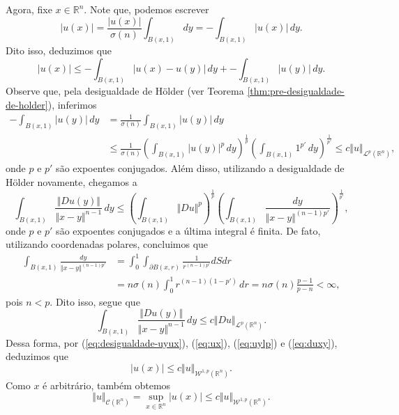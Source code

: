\documentclass[a4paper, 11pt]{book}
\theoremstyle{definition}
\newcommand{\bR}{\mathbb{R}}
\newcommand{\cC}{\mathcal{C}}
\newcommand{\cL}{\mathcal{L}}
\newcommand{\cW}{\mathcal{W}}
\newcommand{\sint}{-\!\!\!\!\!\!\int}
\begin{document}
\begin{prf}
    Agora, fixe $x \in \bR^n$. Note que, podemos escrever
    \[
        |u(x)| = \frac{|u(x)|}{\sigma(n)}\int_{B(x,1)} dy = \sint_{B(x,1)} |u(x)| \,dy.
    \]
    Dito isso, deduzimos que
    \begin{equation} \label{eq:ux}
        |u(x)| \leqslant \sint_{B(x,1)} |u(x) - u(y)| \,dy + \sint_{B(x,1)} |u(y)|\,dy.
    \end{equation}
    Observe que, pela desigualdade de Hölder (ver Teorema \ref{thm:pre-desigualdade-de-holder}), inferimos
    \begin{equation} \label{eq:uylp}
        \begin{aligned}
            \sint_{B(x,1)} |u(y)| \,dy &= \frac{1}{\sigma(n)} \int_{B(x,1)} |u(y)| \,dy\\ 
            &\leqslant \frac{1}{\sigma(n)} \left( \int_{B(x,1)} |u(y)|^p\,dy \right)^{\frac{1}{p}} \left( \int_{B(x,1)} 1^{p'} \,dy \right)^{\frac{1}{p'}} \leqslant c \Vert u \Vert_{\cL^p(\bR^n)},
        \end{aligned}
    \end{equation}
    onde $p$ e $p'$ são expoentes conjugados.
    Além disso, utilizando a desigualdade de Hölder novamente, chegamos a
    \[
        \int_{B(x,1)} \frac{\Vert Du(y) \Vert}{\Vert x - y \Vert^{n-1}} \,dy \leqslant \left( \int_{B(x,1)} \Vert Du \Vert^p \right)^{\frac{1}{p}} \left( \int_{B(x,1)} \frac{dy}{\Vert x - y \Vert^{(n-1)p'}} \right)^{\frac{1}{p'}},
    \]
    onde $p$ e $p'$ são expoentes conjugados e a última integral é finita.
    De fato, utilizando coordenadas polares, concluimos que
    \[
        \begin{aligned}
            \int_{B(x,1)} \frac{dy}{\Vert x - y \Vert^{(n-1)p'}} &= \int_0^1 \int_{\partial B(x,r)} \frac{1}{r^{(n-1)p'}} dSdr\\
            &= n\sigma(n)\int_0^1 r^{(n-1)(1-p')} \,dr = n \sigma(n)  \frac{p-1}{p-n} < \infty,
        \end{aligned}
    \]
    pois $n < p$.
    Dito isso, segue que
    \begin{equation} \label{eq:duxy}
        \int_{B(x,1)} \frac{\Vert Du(y) \Vert}{\Vert x - y \Vert^{n-1}} \,dy \leqslant c\Vert Du \Vert_{\cL^p(\bR^n)}.
    \end{equation}
    Dessa forma, por (\ref{eq:desigualdade-uyux}), (\ref{eq:ux}), (\ref{eq:uylp}) e (\ref{eq:duxy}), deduzimos que
    \[
        |u(x)| \leqslant c \Vert u \Vert_{\cW^{1,p}(\bR^n)}.
    \]
    Como $x$ é arbitrário, também obtemos
    \begin{equation} \label{eq:normac}
        \Vert u \Vert_{\cC(\bR^n)} = \sup_{x \in \bR^n} |u(x)| \leqslant c \Vert u \Vert_{\cW^{1,p}(\bR^n)}.
    \end{equation}


\end{prf}
\end{document}
